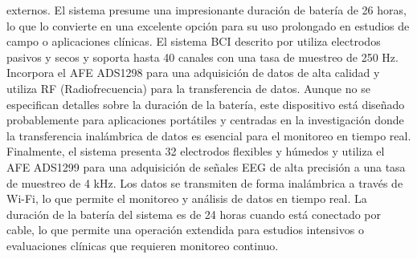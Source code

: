 externos. El sistema presume una impresionante duración de batería de 26 horas, lo que lo convierte en una excelente opción para su uso prolongado en estudios de campo o aplicaciones clínicas. El sistema BCI descrito por \cite{Totev2023} utiliza electrodos pasivos y secos y soporta hasta 40 canales con una tasa de muestreo de 250 Hz. Incorpora el AFE ADS1298 para una adquisición de datos de alta calidad y utiliza RF (Radiofrecuencia) para la transferencia de datos. Aunque no se especifican detalles sobre la duración de la batería, este dispositivo está diseñado probablemente para aplicaciones portátiles y centradas en la investigación donde la transferencia inalámbrica de datos es esencial para el monitoreo en tiempo real. Finalmente, el sistema \cite{Beats} presenta 32 electrodos flexibles y húmedos y utiliza el AFE ADS1299 para una adquisición de señales EEG de alta precisión a una tasa de muestreo de 4 kHz. Los datos se transmiten de forma inalámbrica a través de Wi-Fi, lo que permite el monitoreo y análisis de datos en tiempo real. La duración de la batería del sistema es de 24 horas cuando está conectado por cable, lo que permite una operación extendida para estudios intensivos o evaluaciones clínicas que requieren monitoreo continuo.


